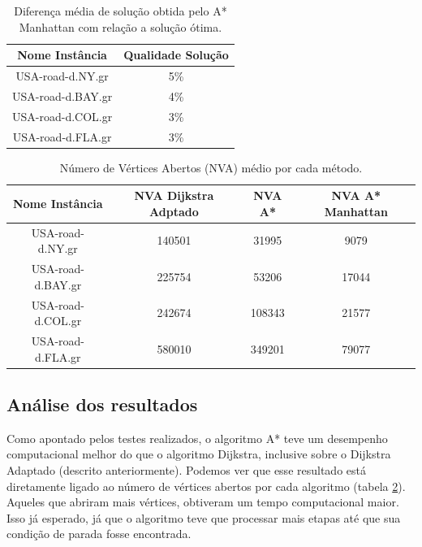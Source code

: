 \begin{table}[H]
\caption{Diferença média de solução obtida pelo A* Manhattan com relação a solução ótima.}
\label{tbl-aestrela-resultados-qualidadesolucao}
\centering
\begin{adjustbox}{max width=\textwidth}
\begin{tabular}{|c|c|}
\hline
\textbf{Nome Instância} & \textbf{Qualidade Solução} \\ \hline
USA-road-d.NY.gr        & 5\%                        \\ \hline
USA-road-d.BAY.gr       & 4\%                        \\ \hline
USA-road-d.COL.gr       & 3\%                        \\ \hline
USA-road-d.FLA.gr       & 3\%                        \\ \hline
\end{tabular} 
\end{adjustbox}
\end{table}

\begin{table}[H]
\caption{Número de Vértices Abertos (NVA) médio por cada método.}
\label{tbl-aestrela-resultados-nva}
\centering
\begin{adjustbox}{max width=\textwidth}
\begin{tabular}{|c|c|c|c|}
\hline
\textbf{Nome Instância} & \textbf{NVA Dijkstra Adptado} & \textbf{NVA A*} & \textbf{NVA A* Manhattan} \\ \hline
USA-road-d.NY.gr        & 140501                        & 31995           & 9079                      \\ \hline
USA-road-d.BAY.gr       & 225754                        & 53206           & 17044                     \\ \hline
USA-road-d.COL.gr       & 242674                        & 108343          & 21577                     \\ \hline
USA-road-d.FLA.gr       & 580010                        & 349201          & 79077                     \\ \hline
\end{tabular} 
\end{adjustbox}
\end{table}

\subsection{Análise dos resultados}
\label{sec-aestrela-resultados-analise}
Como apontado pelos testes realizados, o algoritmo A* teve um desempenho computacional melhor do que o algoritmo Dijkstra, inclusive sobre o Dijkstra Adaptado (descrito anteriormente). Podemos ver que esse resultado está diretamente ligado ao número de vértices abertos por cada algoritmo (tabela \ref{tbl-aestrela-resultados-nva}). Aqueles que abriram mais vértices, obtiveram um tempo computacional maior. Isso já esperado, já que o algoritmo teve que processar mais etapas até que sua condição de parada fosse encontrada.


